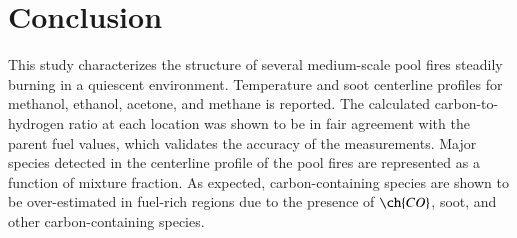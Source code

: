 \documentclass[preprint,review,12pt]{elsarticle}
\begin{document}
\section{Conclusion}
\label{sec:Conclusion}
This study characterizes the structure of several medium-scale pool fires steadily burning in a quiescent environment. Temperature and soot centerline profiles for methanol, ethanol, acetone, and methane is reported. The calculated carbon-to-hydrogen ratio at each location was shown to be in fair agreement with the parent fuel values, which validates the accuracy of the measurements. Major species detected in the centerline profile of the pool fires are represented as a function of mixture fraction. As expected, carbon-containing species are shown to be over-estimated in fuel-rich regions due to the presence of $\ch{CO}$, soot, and other carbon-containing species. 



\end{document}
